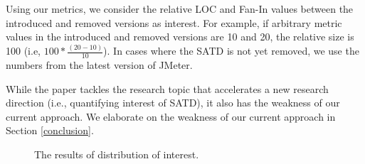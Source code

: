 
Using our metrics, we consider the relative LOC and Fan-In  values between the introduced and removed versions as interest. For example, if arbitrary metric values in the introduced and removed versions are 10 and 20, the relative size is 100 (i.e, $100* \frac{(20-10)}{10}$). In cases where the SATD is not yet removed, we use the numbers from the latest version of JMeter.

While the paper tackles the research topic that accelerates a new research direction (i.e., quantifying interest of SATD), it also has the weakness of our current approach. We elaborate on the weakness of our current approach in Section \ref{conclusion}.


\begin{figure}[!t]
  \begin{center}

  \caption{The results of distribution of interest.}
  \label{fig:dist}
  \end{center}
\end{figure}
